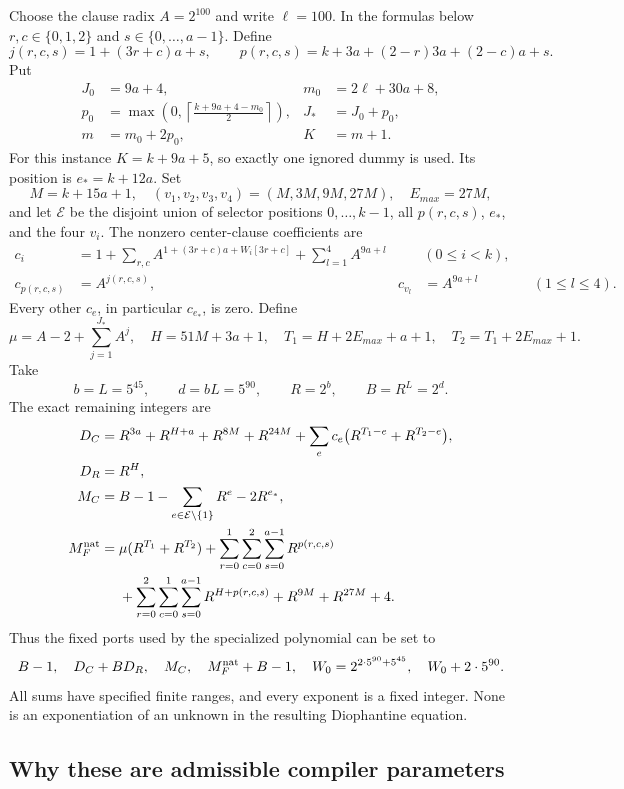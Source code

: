 Choose the clause radix $A=2^{100}$ and write $\ell=100$.
In the formulas below $r,c\in\{0,1,2\}$ and $s\in\{0,\ldots,a-1\}$.
Define
\[
 j(r,c,s)=1+(3r+c)a+s,\qquad
 p(r,c,s)=k+3a+(2-r)3a+(2-c)a+s.
\]
Put
\begin{align*}
 J_0&=9a+4,&m_0&=2\ell+30a+8,\\
 p_0&=\max\!\left(0,\left\lceil\frac{k+9a+4-m_0}{2}\right\rceil\right),
 &J_*&=J_0+p_0,\\
 m&=m_0+2p_0,&K&=m+1.
\end{align*}
For this instance $K=k+9a+5$, so exactly one ignored dummy is used.
Its position is $e_*=k+12a$. Set
\[
 M=k+15a+1,\quad
 (v_1,v_2,v_3,v_4)=(M,3M,9M,27M),\quad E_{max}=27M,
\]
and let $\mathcal E$ be the disjoint union of selector positions
$0,\ldots,k-1$, all $p(r,c,s)$, $e_*$, and the four $v_i$.
The nonzero center-clause coefficients are
\begin{align*}
 c_i&=1+\sum_{r,c}A^{1+(3r+c)a+W_i[3r+c]}
               +\sum_{l=1}^4A^{9a+l} &&(0\leq i<k),\\
 c_{p(r,c,s)}&=A^{j(r,c,s)},&
 c_{v_l}&=A^{9a+l} &&(1\leq l\leq4).
\end{align*}
Every other $c_e$, in particular $c_{e_*}$, is zero. Define
\[
 \mu=A-2+\sum_{j=1}^{J_*}A^j,
 \quad H=51M+3a+1,
 \quad T_1=H+2E_{max}+a+1,
 \quad T_2=T_1+2E_{max}+1.
\]
Take
\[
 b=L=5^{45},\qquad d=bL=5^{90},\qquad
 R=2^b,\qquad B=R^L=2^d.
\]
The exact remaining integers are
\begin{align*}
 D_C={}&R^{3a}+R^{H+a}+R^{8M}+R^{24M}
       +\sum_e c_e\bigl(R^{T_1-e}+R^{T_2-e}\bigr),\\
 D_R={}&R^H,\\
 M_C={}&B-1-\sum_{e\in\mathcal E\setminus\{1\}}R^e-2R^{e_*},\\
 M_F^{\rm nat}={}&\mu(R^{T_1}+R^{T_2})
       +\sum_{r=0}^1\sum_{c=0}^2\sum_{s=0}^{a-1}R^{p(r,c,s)}\\
       &+\sum_{r=0}^2\sum_{c=0}^1\sum_{s=0}^{a-1}R^{H+p(r,c,s)}
       +R^{9M}+R^{27M}+4.
\end{align*}
Thus the fixed ports used by the specialized polynomial can be set to
\[
 B-1,\quad D_C+BD_R,\quad M_C,\quad M_F^{\rm nat}+B-1,
 \quad W_0=2^{2\cdot5^{90}+5^{45}},\quad W_0+2\cdot5^{90}.
\]
All sums have specified finite ranges, and every exponent is a fixed
integer. None is an exponentiation of an unknown in the resulting
Diophantine equation.

\subsection{Why these are admissible compiler parameters}

